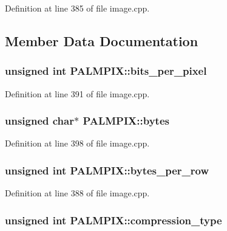 Definition at line 385 of file image.\+cpp.



\subsection{Member Data Documentation}
\hypertarget{structPALMPIX_aa3505215b23213464cbdd7058e906571}{
\subsubsection[{bits\+\_\+per\+\_\+pixel}]{\setlength{\rightskip}{0pt plus 5cm}unsigned int P\+A\+L\+M\+P\+I\+X\+::bits\+\_\+per\+\_\+pixel}}\label{structPALMPIX_aa3505215b23213464cbdd7058e906571}


Definition at line 391 of file image.\+cpp.

\hypertarget{structPALMPIX_a5830c51eb001f0889defa52bb7e540c2}{
\subsubsection[{bytes}]{\setlength{\rightskip}{0pt plus 5cm}unsigned char$\ast$ P\+A\+L\+M\+P\+I\+X\+::bytes}}\label{structPALMPIX_a5830c51eb001f0889defa52bb7e540c2}


Definition at line 398 of file image.\+cpp.

\hypertarget{structPALMPIX_af1a24f1ea6245a31aaba0a247f5f9488}{
\subsubsection[{bytes\+\_\+per\+\_\+row}]{\setlength{\rightskip}{0pt plus 5cm}unsigned int P\+A\+L\+M\+P\+I\+X\+::bytes\+\_\+per\+\_\+row}}\label{structPALMPIX_af1a24f1ea6245a31aaba0a247f5f9488}


Definition at line 388 of file image.\+cpp.

\hypertarget{structPALMPIX_a465da1cce6c60b201fcb17d48f793f79}{
\subsubsection[{compression\+\_\+type}]{\setlength{\rightskip}{0pt plus 5cm}unsigned int P\+A\+L\+M\+P\+I\+X\+::compression\+\_\+type}}\label{structPALMPIX_a465da1cce6c60b201fcb17d48f793f79}



